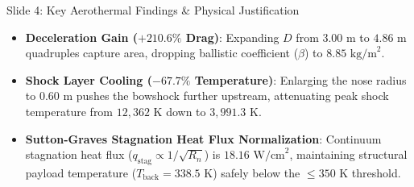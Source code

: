 \documentclass[aspectratio=169,10pt]{beamer}
\begin{document}
\begin{frame}{Slide 4: Key Aerothermal Findings \& Physical Justification}
  \begin{itemize}
    \item \textbf{Deceleration Gain ($+210.6\%$ Drag)}:
      Expanding $D$ from $3.00\text{ m}$ to $4.86\text{ m}$ quadruples capture area, dropping ballistic coefficient ($\beta$) to $8.85\text{ kg/m}^2$.
    \item \textbf{Shock Layer Cooling ($-67.7\%$ Temperature)}:
      Enlarging the nose radius to $0.60\text{ m}$ pushes the bowshock further upstream, attenuating peak shock temperature from $12,362\text{ K}$ down to $3,991.3\text{ K}$.
    \item \textbf{Sutton-Graves Stagnation Heat Flux Normalization}:
      Continuum stagnation heat flux ($q_{\text{stag}} \propto 1/\sqrt{R_n}$) is $18.16\text{ W/cm}^2$, maintaining structural payload temperature ($T_{\text{back}} = 338.5\text{ K}$) safely below the $\le 350\text{ K}$ threshold.
  \end{itemize}
\end{frame}
\end{document}

